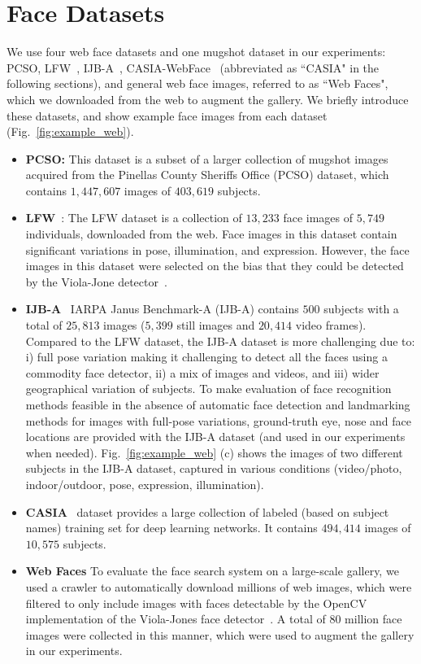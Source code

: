 \documentclass[10pt,journal,compsoc]{IEEEtran}
\begin{document}
\section{Face Datasets}\label{sec:database}
We use four web face datasets and one mugshot dataset in our experiments: PCSO, LFW~\cite{DB:LFWTech}, IJB-A~\cite{db:janus}, CASIA-WebFace~\cite{DB:CASIA} (abbreviated as ``CASIA" in the following sections), and general web face images, referred to as ``Web Faces", which we downloaded from the web to augment the gallery. We briefly introduce these datasets, and show example face images from each dataset (Fig.~\ref{fig:example_web}).
\begin{itemize}
  \item \textbf{PCSO:} This dataset is a subset of a larger collection of mugshot images acquired from the Pinellas County Sheriffs Office (PCSO) dataset, which contains $1,447,607$ images of $403,619$ subjects.
  \item \textbf{LFW}~\cite{DB:LFWTech}: The LFW dataset is a collection of $13,233$ face images of $5,749$ individuals, downloaded from the web. Face images in this dataset contain significant variations in pose, illumination, and expression. However, the face images in this dataset were selected on the bias that they could be detected by the Viola-Jone detector~\cite{DB:LFWTech,Viola}.
  \item \textbf{IJB-A}~\cite{db:janus} IARPA Janus Benchmark-A (IJB-A) contains $500$ subjects with a total of $25,813$ images ($5,399$ still images and $20,414$ video frames). Compared to the LFW dataset, the IJB-A dataset is more challenging due to: i) full pose variation making it challenging to detect all the faces using a commodity face detector, ii) a mix of images and videos, and iii) wider geographical variation of subjects. To make evaluation of face recognition methods feasible in the absence of automatic face detection and landmarking methods  for images with full-pose variations, ground-truth eye, nose and face locations are provided with the IJB-A dataset (and used in our experiments when needed). Fig.~\ref{fig:example_web} (c) shows the images of two different subjects in the IJB-A dataset, captured in various conditions (video/photo, indoor/outdoor, pose, expression, illumination).
  \item \textbf{CASIA}~\cite{DB:CASIA} dataset provides a large collection of labeled (based on subject names) training set for deep learning networks. It contains $494,414$ images of $10,575$ subjects.
  \item \textbf{Web Faces} To evaluate the face search system on a large-scale gallery, we used a crawler to automatically download millions of web images, which were filtered to only include images with faces detectable by the OpenCV implementation of the Viola-Jones face detector~\cite{Viola}. A total of $80$ million face images were collected in this manner, which were used to augment the gallery in our experiments.
\end{itemize}
\end{document}
